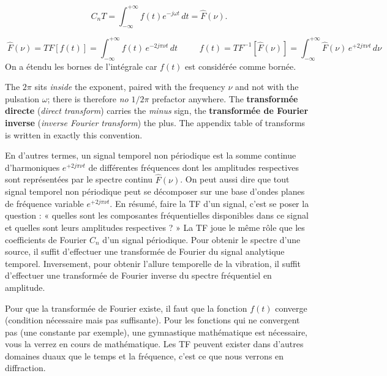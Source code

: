 \[
  C_nT=\int_{-\infty}^{+\infty}f(t)e^{-j\omega t}\,dt=\hat{F}(\nu).
\]

\begin{definition}
  \[
    \boxed{\;\hat{F}(\nu)=TF[f(t)]=\int_{-\infty}^{+\infty}f(t)\,e^{-2j\pi\nu t}\,dt\;}
    \qquad
    \boxed{\;f(t)=TF^{-1}[\hat{F}(\nu)]=\int_{-\infty}^{+\infty}\hat{F}(\nu)\,e^{+2j\pi\nu t}\,d\nu\;}
  \]
  On a étendu les bornes de l'intégrale car $f(t)$ est considérée comme bornée.
\end{definition}

\begin{notation}
  The $2\pi$ sits \emph{inside} the exponent, paired with the frequency $\nu$
  and not with the pulsation $\omega$; there is therefore \emph{no} $1/2\pi$
  prefactor anywhere. The \textbf{transformée directe} (\textit{direct
  transform}) carries the \emph{minus} sign, the \textbf{transformée de Fourier
  inverse} (\textit{inverse Fourier transform}) the plus. The appendix table of
  transforms is written in exactly this convention.
\end{notation}

En d'autres termes, un signal temporel non périodique est la somme continue
d'harmoniques $e^{+2j\pi\nu t}$ de différentes fréquences dont les amplitudes
respectives sont représentées par le spectre continu $\hat F(\nu)$. On peut
aussi dire que tout signal temporel non périodique peut se décomposer sur une
base d'ondes planes de fréquence variable $e^{+2j\pi\nu t}$. En résumé, faire la
TF d'un signal, c'est se poser la question : « quelles sont les composantes
fréquentielles disponibles dans ce signal et quelles sont leurs amplitudes
respectives ? » La TF joue le même rôle que les coefficients de Fourier $C_n$
d'un signal périodique. Pour obtenir le spectre d'une source, il suffit
d'effectuer une transformée de Fourier du signal analytique temporel.
Inversement, pour obtenir l'allure temporelle de la vibration, il suffit
d'effectuer une transformée de Fourier inverse du spectre fréquentiel en
amplitude.

\begin{remark}
  Pour que la transformée de Fourier existe, il faut que la fonction $f(t)$
  converge (condition nécessaire mais pas suffisante). Pour les fonctions qui ne
  convergent pas (une constante par exemple), une gymnastique mathématique est
  nécessaire, vous la verrez en cours de mathématique. Les TF peuvent
  exister dans d'autres domaines duaux que le temps et la fréquence, c'est ce
  que nous verrons en diffraction.
\end{remark}

